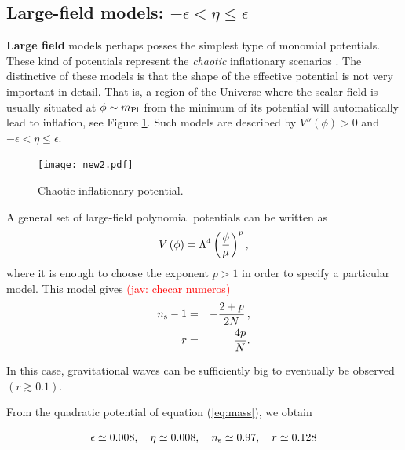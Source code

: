 \documentclass{rmaa}
\newcommand{\jav}[1]{\textcolor{red}{(jav: #1)}}
\begin{document}
\subsection{Large-field models: $-\epsilon < \eta \leq \epsilon$}


\textbf{Large field} models perhaps posses the simplest type of monomial potentials.
These kind of potentials represent the \textit{chaotic} inflationary
scenarios \citep{Linde2}. The distinctive of these models is that the  
shape of the effective potential is not very important in detail. That is, a region
of the Universe where the scalar field is usually situated at $ \phi \sim m_{\rm Pl}$ 
from the minimum of its potential will automatically lead to inflation, see Figure \ref{fig:new1}. Such
models are described by $V''\left(\phi\right) > 0$ and $-\epsilon < \eta
\leq \epsilon$. 
\\

 \begin{figure}
 \begin{center}
  \texttt{[image: new2.pdf]}
	\caption{Chaotic inflationary potential.}
	\label{fig:new1}
\end{center}	
\end{figure}

\noindent
 A general set of large-field polynomial potentials can be written as
%
\begin{equation}
V\left(\phi\right) = \Lambda^4 \left({\phi \over \mu}\right)^p,
\end{equation}
where it is enough to choose the exponent $p>1$ in order to specify a particular model.
%
This model gives \jav{checar numeros}
\begin{eqnarray}
n_{\rm s}-1&=&-\frac{2+p}{2N}\, ,\nonumber\\
r&=&\frac{4 p}{N}.
\end{eqnarray}

\noindent
In this case, gravitational waves can be sufficiently big to eventually be observed $(r\gtrsim 0.1)$.

From the quadratic potential of equation (\ref{eq:mass}), we obtain

\begin{equation}
\epsilon \simeq 0.008, \quad \eta \simeq 0.008, \quad n_{\rm s} \simeq 0.97, \quad r \simeq 0.128
\end{equation}
\end{document}
